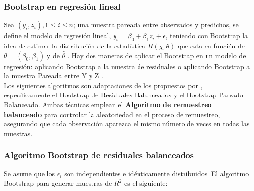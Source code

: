 \subsubsection{Bootstrap en regresión lineal}

Sea $(y_{i}, z_{i}),  1 \leq  i \leq n$; una muestra pareada entre observados y predichos, se define el modelo de regresión lineal, $ y_{i} = \beta_{0} + \beta_{1}z_{i} +\epsilon $, teniendo con Bootstrap la idea de  estimar la distribución de la estadística $R( \chi, \theta)$ que esta en función de $\theta = (\beta_{0}, \beta_{1}) $ y de $\hat{\theta}$ \parencite{zacarias-2023}. Hay dos maneras de aplicar el Bootstrap
en un modelo de regresión: aplicando Bootstrap a la muestra de residuales o aplicando Bootstrap a la muestra Pareada entre Y y Z \parencite{balam-2012}.\\

Los siguientes algoritmos son adaptaciones de los propuestos por \textcite{balam-2012}, específicamente el Bootstrap de Residuales Balanceados y el Bootstrap Pareado Balanceado. Ambas técnicas emplean el \textbf{Algoritmo de remuestreo balanceado} para controlar la aleatoriedad en el proceso de remuestreo, asegurando que cada observación aparezca el mismo número de veces en todas las muestras.\\


\subsubsection{Algoritmo Bootstrap de residuales balanceados}

Se asume que los \( \epsilon_{i} \) son independientes e idénticamente distribuidos. El algoritmo Bootstrap para generar muestras de \( R^{2} \) es el siguiente:

